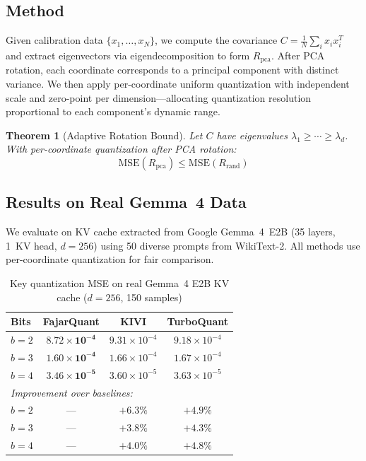 \documentclass[10pt,twocolumn]{article}
\newtheorem{theorem}{Theorem}
\begin{document}
\subsection{Method}

Given calibration data $\{x_1, \ldots, x_N\}$, we compute the covariance $C = \frac{1}{N} \sum_i x_i x_i^T$ and extract eigenvectors via eigendecomposition to form $R_{\text{pca}}$. After PCA rotation, each coordinate corresponds to a principal component with distinct variance. We then apply per-coordinate uniform quantization with independent scale and zero-point per dimension---allocating quantization resolution proportional to each component's dynamic range.

\begin{theorem}[Adaptive Rotation Bound]
Let $C$ have eigenvalues $\lambda_1 \geq \cdots \geq \lambda_d$. With per-coordinate quantization after PCA rotation:
\begin{equation}
\text{MSE}(R_{\text{pca}}) \leq \text{MSE}(R_{\text{rand}})
\end{equation}
\end{theorem}

\subsection{Results on Real Gemma~4 Data}

We evaluate on KV cache extracted from Google Gemma~4~E2B (35 layers, 1~KV head, $d{=}256$) using 50 diverse prompts from WikiText-2. All methods use per-coordinate quantization for fair comparison.

\begin{table}[t]
\centering
\small
\caption{Key quantization MSE on real Gemma~4 E2B KV cache ($d{=}256$, 150 samples)}
\label{tab:mse_real}
\begin{tabular}{lccc}
\toprule
Bits & FajarQuant & KIVI & TurboQuant \\
\midrule
$b{=}2$ & $\mathbf{8.72 \times 10^{-4}}$ & $9.31 \times 10^{-4}$ & $9.18 \times 10^{-4}$ \\
$b{=}3$ & $\mathbf{1.60 \times 10^{-4}}$ & $1.66 \times 10^{-4}$ & $1.67 \times 10^{-4}$ \\
$b{=}4$ & $\mathbf{3.46 \times 10^{-5}}$ & $3.60 \times 10^{-5}$ & $3.63 \times 10^{-5}$ \\
\midrule
\multicolumn{4}{l}{\textit{Improvement over baselines:}} \\
$b{=}2$ & --- & $+6.3\%$ & $+4.9\%$ \\
$b{=}3$ & --- & $+3.8\%$ & $+4.3\%$ \\
$b{=}4$ & --- & $+4.0\%$ & $+4.8\%$ \\
\bottomrule
\end{tabular}
\end{table}
\end{document}
